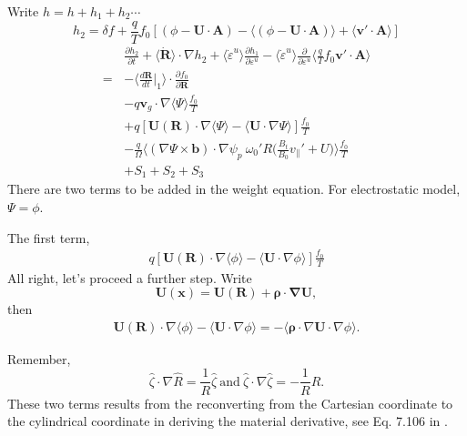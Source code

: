\documentclass[12pt]{article}
\begin{document}
\begin{CJK*}{UTF8}{gbsn}
Write $h=h + h_1 + h_2 \cdots$
\begin{equation}
    h_2 = \delta f + \frac{q}{T}f_0 [(\phi - \mathbf{U\cdot A}) - \langle(\phi - \mathbf{U\cdot A})\rangle + \langle\mathbf{v'\cdot A}\rangle]
\end{equation}
\begin{equation}
\begin{split}
    \ \ \ \ &\frac{\partial h_2}{\partial t} + \langle\mathbf{\dot{R}}\rangle\cdot\nabla h_2 + \langle\dot{\varepsilon}^u\rangle\frac{\partial h_1}{\partial\varepsilon^u}
    - \langle\dot{\varepsilon}^u\rangle\frac{\partial }{\partial\varepsilon^u}\langle\frac{q}{T}f_0\mathbf{v'\cdot A}\rangle\\
    =&-\bigg\langle\frac{d\mathbf{R}}{dt}\bigg|_1\bigg\rangle\cdot\frac{\partial f_0}{\partial\mathbf{R}}\\
    &-q\mathbf{v}_g\cdot\nabla\langle\Psi\rangle\frac{f_0}{T}\\
    &+q[\mathbf{U(R)}\cdot\nabla\langle\Psi\rangle-\langle\mathbf{U}\cdot\nabla\Psi\rangle]\frac{f_0}{T}\\
    &-\frac{q}{\Omega}\bigg\langle(\nabla\Psi\times\mathbf{b})\cdot\nabla\psi_p\ \omega_0'R\bigg(\frac{B_t}{B_0}v_\parallel'+U\bigg)\bigg\rangle\frac{f_0}{T}\\
    &+S_1+S_2+S_3
\end{split}
\end{equation}
There are two terms to be added in the weight equation. For electrostatic model, $\Psi=\phi$.

The first term, 
\begin{equation}
\begin{split}
    q[\mathbf{U(R)}\cdot\nabla\langle\phi\rangle-\langle\mathbf{U}\cdot\nabla\phi\rangle]\frac{f_0}{T}
\end{split}
\end{equation}
All right, let's proceed a further step. Write
\begin{equation}
    \mathbf{U(x)=U(R) + \boldsymbol{\rho}\cdot\nabla U},
\end{equation}
then
\begin{equation}
    \begin{split}
        \mathbf{U(R)}\cdot\nabla\langle\phi\rangle-\langle\mathbf{U}\cdot\nabla\phi\rangle=-\langle\boldsymbol{\rho}\cdot\nabla \mathbf{U}\cdot\nabla\phi\rangle.
    \end{split}
\end{equation}
{\color{cyan}Remember,
\begin{equation*}
\hat{\zeta}\cdot\nabla\hat{R}=\frac{1}{R}\hat{\zeta}\ \textrm{and}\ \hat{\zeta}\cdot\nabla\hat{\zeta}=-\frac{1}{R}\hat{R}.   
\end{equation*}
These two terms results from the reconverting from the Cartesian coordinate to the cylindrical coordinate in deriving the material derivative,
see Eq. 7.106 in \cite{vc}.

}
\end{CJK*}
\end{document}
